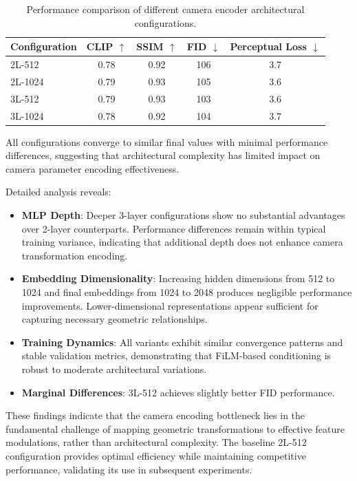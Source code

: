 \begin{table}[htbp]
  \centering
  \caption{Performance comparison of different camera encoder architectural configurations.}
  \label{tab:camera_encoder_results}
  \begin{tabular}{lcccc}
    \toprule
    \textbf{Configuration} & \textbf{CLIP} $\uparrow$ & \textbf{SSIM} $\uparrow$ & \textbf{FID} $\downarrow$ & \textbf{Perceptual Loss} $\downarrow$ \\
    \midrule
    2L-512 & 0.78 & 0.92 & 106 & 3.7 \\
    2L-1024 & 0.79 & 0.93 & 105 & 3.6 \\
    3L-512 & 0.79 & 0.93 & 103 & 3.6 \\
    3L-1024 & 0.78 & 0.92 & 104 & 3.7 \\
    \bottomrule
  \end{tabular}
\end{table}

All configurations converge to similar final values with minimal performance differences, suggesting that architectural complexity has limited impact on camera parameter encoding effectiveness.

Detailed analysis reveals:
\begin{itemize}
  \item \textbf{MLP Depth}: Deeper 3-layer configurations show no substantial advantages over 2-layer counterparts. Performance differences remain within typical training variance, indicating that additional depth does not enhance camera transformation encoding.
  \item \textbf{Embedding Dimensionality}: Increasing hidden dimensions from 512 to 1024 and final embeddings from 1024 to 2048 produces negligible performance improvements. Lower-dimensional representations appear sufficient for capturing necessary geometric relationships.
  \item \textbf{Training Dynamics}: All variants exhibit similar convergence patterns and stable validation metrics, demonstrating that FiLM-based conditioning is robust to moderate architectural variations.
  \item \textbf{Marginal Differences}: 3L-512 achieves slightly better FID performance.
\end{itemize}

These findings indicate that the camera encoding bottleneck lies in the fundamental challenge of mapping geometric transformations to effective feature modulations, rather than architectural complexity. The baseline 2L-512 configuration provides optimal efficiency while maintaining competitive performance, validating its use in subsequent experiments.

